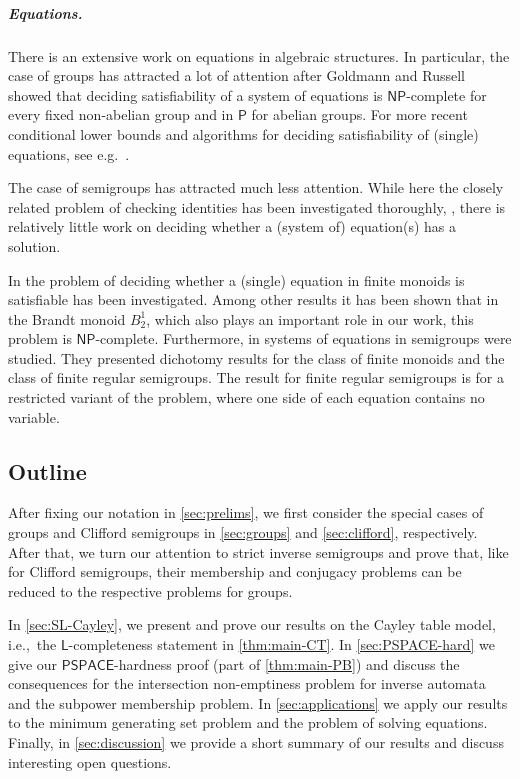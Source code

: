 \documentclass[anonymous,letter,UKenglish,cleveref,autoref,thm-restate]{lipics-v2021}
\newcommand{\ie}{i.e.,~}
\newcommand{\eg}{e.g.~}
\newcommand{\Ptime}{\ensuremath{\mathsf{P}}\xspace}
\newcommand{\LOGSPACE}{\ensuremath{\mathsf{L}}\xspace}
\newcommand{\NP}{\ensuremath{\mathsf{NP}}\xspace}
\newcommand{\PSPACE}{\ensuremath{\mathsf{PSPACE}}\xspace}
\theoremstyle{plain}
\theoremstyle{plain}
\newcommand{\mysubparagraph}[1]{\vspace*{-2mm}\subparagraph*{#1}}
\begin{document}
\mysubparagraph{Equations.}

There is an extensive work on equations in algebraic structures. 
In particular, the case of groups has attracted a lot of attention after Goldmann and Russell \cite{GoldmannR02} showed that deciding satisfiability of a system of equations is \NP-complete for every fixed non-abelian group and in \Ptime for abelian groups. 
For more recent conditional lower bounds and algorithms for deciding satisfiability of (single) equations, see \eg \cite{IdziakKKW22,IdziakKKW24,FoldvariH19}.

The case of semigroups has attracted much less attention.
While here the closely related problem of checking identities has been investigated thoroughly, \cite{Klima09,SeifS06,Kisielewicz04,AlmeidaVG09,Seif05}, there is relatively little work on deciding whether a (system of) equation(s) has a solution.

In \cite{BarringtonMMTT00} the problem of deciding whether a (single) equation in finite monoids is satisfiable has been investigated.
Among other results it has been shown that in the Brandt monoid $B_2^1$, which also plays an important role in our work, this problem is \NP-complete.
Furthermore, in \cite{KlimaTT07} systems of equations in semigroups were studied.
They presented dichotomy results for the class of finite monoids and the class of finite regular semigroups.
The result for finite regular semigroups is for a restricted variant of the problem, where one side of each equation contains no variable.



\subsection{Outline}

After fixing our notation in \cref{sec:prelims}, we first consider the special cases of groups and Clifford semigroups in \cref{sec:groups} and \cref{sec:clifford}, respectively.
After that, we turn our attention to strict inverse semigroups and prove that, like for Clifford semigroups, their membership and conjugacy problems can be reduced to the respective problems for groups.


In \cref{sec:SL-Cayley}, we present and prove our results on the Cayley table model, \ie the \LOGSPACE-completeness statement in \cref{thm:main-CT}.
In \cref{sec:PSPACE-hard} we give our \PSPACE-hardness proof (part of \cref{thm:main-PB}) and discuss the consequences for the intersection non-emptiness problem for inverse automata and the subpower membership problem.
In \cref{sec:applications} we apply our results to the minimum generating set problem and the problem of solving equations.
Finally, in \cref{sec:discussion} we provide a short summary of our results and discuss interesting open questions.
\end{document}
